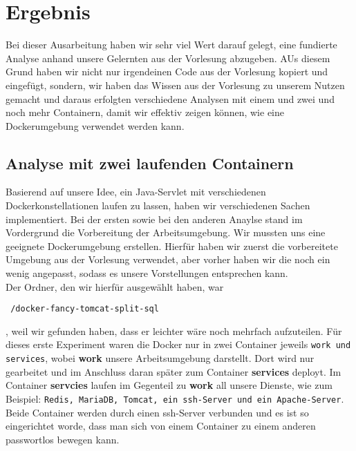\section{Ergebnis}\label{Ergebnis}


Bei dieser Ausarbeitung haben wir sehr viel Wert darauf gelegt, eine fundierte Analyse anhand unsere Gelernten aus der Vorlesung abzugeben. AUs diesem Grund haben wir nicht nur irgendeinen Code aus der Vorlesung kopiert und eingefügt, sondern, wir haben das Wissen aus der Vorlesung zu unserem Nutzen gemacht und daraus erfolgten verschiedene Analysen mit einem und zwei und noch mehr Containern, damit wir effektiv zeigen können, wie eine Dockerumgebung verwendet werden kann.

\subsection{Analyse mit zwei laufenden Containern}


Basierend auf unsere Idee, ein Java-Servlet mit verschiedenen Dockerkonstellationen laufen zu lassen, haben wir verschiedenen Sachen implementiert. Bei der ersten sowie bei den anderen Anaylse stand im Vordergrund die Vorbereitung der Arbeitsumgebung. Wir mussten uns eine geeignete Dockerumgebung erstellen. Hierfür haben wir zuerst die vorbereitete Umgebung aus der Vorlesung verwendet, aber vorher haben wir die noch ein wenig angepasst, sodass es unsere Vorstellungen entsprechen kann.\\

Der Ordner, den wir hierfür  ausgewählt haben, war \begin{verbatim} /docker-fancy-tomcat-split-sql \end{verbatim}, weil wir gefunden haben, dass er leichter wäre noch mehrfach aufzuteilen. Für dieses erste Experiment waren die Docker nur in  zwei Container jeweils \texttt{work und services}, wobei \textbf{work} unsere Arbeitsumgebung darstellt. Dort wird nur gearbeitet und im Anschluss daran später zum Container \textbf{services} deployt. Im Container \textbf{servcies} laufen im Gegenteil zu \textbf{work} all unsere Dienste, wie zum Beispiel: \texttt{Redis, MariaDB, Tomcat, ein ssh-Server und ein Apache-Server}. Beide Container werden durch einen ssh-Server verbunden und es ist so eingerichtet worde, dass man sich von einem Container zu einem anderen passwortlos bewegen kann.\\

